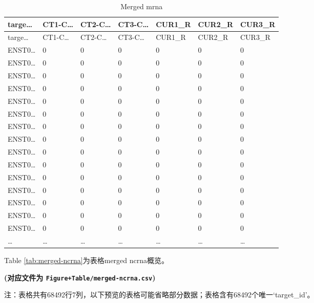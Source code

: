 \documentclass[
]{article}
\begin{document}
\begin{longtable}[]{@{}lllllll@{}}
\caption{\label{tab:merged-mrna}Merged mrna}\tabularnewline
\toprule
targe\ldots{} & CT1-C\ldots{} & CT2-C\ldots{} & CT3-C\ldots{} & CUR1\_R & CUR2\_R & CUR3\_R\tabularnewline
\midrule
\endfirsthead
\toprule
targe\ldots{} & CT1-C\ldots{} & CT2-C\ldots{} & CT3-C\ldots{} & CUR1\_R & CUR2\_R & CUR3\_R\tabularnewline
\midrule
\endhead
ENST0\ldots{} & 0 & 0 & 0 & 0 & 0 & 0\tabularnewline
ENST0\ldots{} & 0 & 0 & 0 & 0 & 0 & 0\tabularnewline
ENST0\ldots{} & 0 & 0 & 0 & 0 & 0 & 0\tabularnewline
ENST0\ldots{} & 0 & 0 & 0 & 0 & 0 & 0\tabularnewline
ENST0\ldots{} & 0 & 0 & 0 & 0 & 0 & 0\tabularnewline
ENST0\ldots{} & 0 & 0 & 0 & 0 & 0 & 0\tabularnewline
ENST0\ldots{} & 0 & 0 & 0 & 0 & 0 & 0\tabularnewline
ENST0\ldots{} & 0 & 0 & 0 & 0 & 0 & 0\tabularnewline
ENST0\ldots{} & 0 & 0 & 0 & 0 & 0 & 0\tabularnewline
ENST0\ldots{} & 0 & 0 & 0 & 0 & 0 & 0\tabularnewline
ENST0\ldots{} & 0 & 0 & 0 & 0 & 0 & 0\tabularnewline
ENST0\ldots{} & 0 & 0 & 0 & 0 & 0 & 0\tabularnewline
ENST0\ldots{} & 0 & 0 & 0 & 0 & 0 & 0\tabularnewline
ENST0\ldots{} & 0 & 0 & 0 & 0 & 0 & 0\tabularnewline
ENST0\ldots{} & 0 & 0 & 0 & 0 & 0 & 0\tabularnewline
\ldots{} & \ldots{} & \ldots{} & \ldots{} & \ldots{} & \ldots{} & \ldots{}\tabularnewline
\bottomrule
\end{longtable}

Table \ref{tab:merged-ncrna}为表格merged ncrna概览。

\textbf{(对应文件为 \texttt{Figure+Table/merged-ncrna.csv})}

\begin{center}\begin{tcolorbox}[colback=gray!10, colframe=gray!50, width=0.9\linewidth, arc=1mm, boxrule=0.5pt]注：表格共有68492行7列，以下预览的表格可能省略部分数据；表格含有68492个唯一`target\_id'。
\end{tcolorbox}
\end{center}
\end{document}
